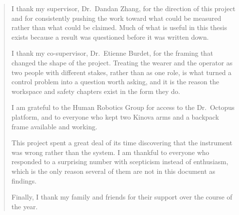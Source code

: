 \renewcommand{\abstractname}{Acknowledgements}
\begin{abstract}
I thank my supervisor, Dr.\ Dandan Zhang, for the direction of this project
and for consistently pushing the work toward what could be measured rather
than what could be claimed. Much of what is useful in this thesis exists
because a result was questioned before it was written down.

I thank my co-supervisor, Dr.\ Etienne Burdet, for the framing that changed
the shape of the project. Treating the wearer and the operator as two people
with different stakes, rather than as one role, is what turned a control
problem into a question worth asking, and it is the reason the workspace and
safety chapters exist in the form they do.

I am grateful to the Human Robotics Group for access to the Dr.\ Octopus
platform, and to everyone who kept two Kinova arms and a backpack frame
available and working.

This project spent a great deal of its time discovering that the instrument
was wrong rather than the system. I am thankful to everyone who responded to a
surprising number with scepticism instead of enthusiasm, which is the only
reason several of them are not in this document as findings.

Finally, I thank my family and friends for their support over the course of
the year.
\end{abstract}
